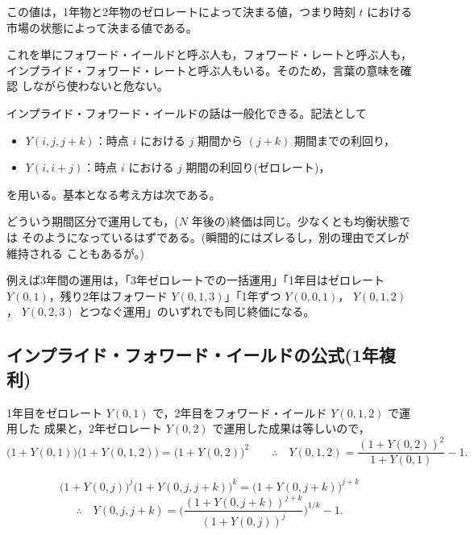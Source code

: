この値は，1年物と2年物のゼロレートによって決まる値，つまり時刻 $t$ における
市場の状態によって決まる値である。

\begin{remark}
これを単にフォワード・イールドと呼ぶ人も，フォワード・レートと呼ぶ人も，
インプライド・フォワード・レートと呼ぶ人もいる。そのため，言葉の意味を確認
しながら使わないと危ない。
\end{remark}

インプライド・フォワード・イールドの話は一般化できる。記法として
\begin{itemize}
\item $Y(i,j,j+k)$：時点 $i$ における $j$ 期間から $(j+k)$ 期間までの利回り，
\item $Y(i,i+j)$：時点 $i$ における $j$ 期間の利回り(ゼロレート)，
\end{itemize}
を用いる。基本となる考え方は次である。

\begin{keypoint}[裁定の考え方]
どういう期間区分で運用しても，($N$ 年後の)終価は同じ。少なくとも均衡状態では
そのようになっているはずである。(瞬間的にはズレるし，別の理由でズレが維持される
こともあるが。)
\end{keypoint}

例えば3年間の運用は，「3年ゼロレートでの一括運用」「1年目はゼロレート
$Y(0,1)$，残り2年はフォワード $Y(0,1,3)$」「1年ずつ $Y(0,0,1)$， $Y(0,1,2)$，
$Y(0,2,3)$ とつなぐ運用」のいずれでも同じ終価になる。

\subsection{インプライド・フォワード・イールドの公式(1年複利)}

\begin{example}[例1:2年間の投資]
1年目をゼロレート $Y(0,1)$ で，2年目をフォワード・イールド $Y(0,1,2)$ で運用した
成果と，2年ゼロレート $Y(0,2)$ で運用した成果は等しいので，
\[
\bigl(1+Y(0,1)\bigr)\bigl(1+Y(0,1,2)\bigr) = \bigl(1+Y(0,2)\bigr)^2
\qquad\therefore\quad
Y(0,1,2) = \frac{(1+Y(0,2))^2}{1+Y(0,1)} - 1.
\]
\end{example}

\begin{example}
\[
\bigl(1+Y(0,j)\bigr)^{j}\bigl(1+Y(0,j,j+k)\bigr)^{k}
= \bigl(1+Y(0,j+k)\bigr)^{j+k}
\]
\[
\therefore\quad
Y(0,j,j+k) = \Biggl(\frac{(1+Y(0,j+k))^{j+k}}{(1+Y(0,j))^{j}}\Biggr)^{1/k} - 1.
\]
\end{example}

